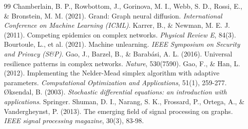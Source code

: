 \documentclass[review,12pt]{elsarticle}
\begin{document}
\begin{thebibliography}{99}
Chamberlain, B. P., Rowbottom, J., Gorinova, M. I., Webb, S. D., Rossi, E., \& Bronstein, M. M. (2021). Grand: Graph neural diffusion. \emph{International Conference on Machine Learning (ICML)}.
Karrer, B., \& Newman, M. E. J. (2011). Competing epidemics on complex networks. \emph{Physical Review E}, 84(3).
Bourtoule, L., et al. (2021). Machine unlearning. \emph{IEEE Symposium on Security and Privacy (S\&P)}.
Gao, J., Barzel, B., \& Barabási, A. L. (2016). Universal resilience patterns in complex networks. \emph{Nature}, 530(7590).
Gao, F., \& Han, L. (2012). Implementing the Nelder-Mead simplex algorithm with adaptive parameters. \emph{Computational Optimization and Applications}, 51(1), 259-277.
{\O}ksendal, B. (2003). \emph{Stochastic differential equations: an introduction with applications}. Springer.
Shuman, D. I., Narang, S. K., Frossard, P., Ortega, A., \& Vandergheynst, P. (2013). The emerging field of signal processing on graphs. \emph{IEEE signal processing magazine}, 30(3), 83-98.
\end{thebibliography}
\end{document}
